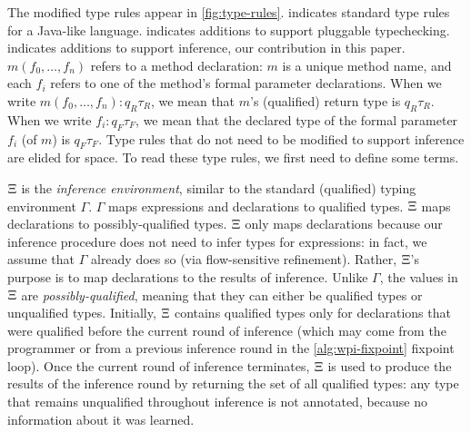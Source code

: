 \begin{figure*}
  \caption{Modified type rules used by our pluggable type framework.  indicates
    standard type rules for a Java-like language.  indicates additions to support
    pluggable typechecking.  indicates additions to support inference, \ie our
    contribution in this paper.
    Throughout, ``R'' subscripts refer to return types; ``F'' to formal parameters; ``A'' to
    actual arguments; and ``I'' to inference results.
    In an assignment \<x=y>, \<x> is the ``formal'' and \<y> is the ``actual''.
    In the \textsc{OVERRIDE} rule, the subscripts ``B'' and ``P'' are mneumonics
    for ``suBtype'' and ``suPertype'', referring the overriding method and the overidden
    method, respectively.
    Type rules that do not require modification to support inference
    are elided for space.}
  \label{fig:type-rules}
\end{figure*}

The modified type rules appear in \cref{fig:type-rules}.  indicates
standard type rules for a Java-like language.  indicates additions to support
pluggable typechecking.  indicates additions to support inference, \ie our
contribution in this paper.
%
$m(f_0,\ldots,f_n)$ refers to a method declaration: $m$ is a unique method name,
and each $f_i$ refers to one of the method's formal parameter declarations. When
we write $m(f_0,\ldots,f_n) : q_R \tau_R$, we mean that $m$'s (qualified) return
type is $q_R \tau_R$. When we write $f_i : q_F \tau_F$, we mean that the declared
type of the formal parameter $f_i$ (of $m$) is $q_F \tau_F$.
%
Type rules that do not need to be modified to support inference are elided for space.
%
To read these type rules, we first need to define some terms.

$\Xi$ is the \emph{inference environment}, similar to the standard (qualified)
typing environment $\Gamma$. $\Gamma$ maps expressions and declarations to qualified types.
$\Xi$ maps declarations to possibly-qualified types.
$\Xi$ only maps declarations because our inference procedure does not need to infer
types for expressions: in fact, we assume that $\Gamma$ already does so (via flow-sensitive
refinement). Rather, $\Xi$'s purpose is to map declarations to the results of inference.
Unlike $\Gamma$, the values in $\Xi$ are \emph{possibly-qualified}, meaning that they can either
be qualified types or unqualified types. Initially, $\Xi$ contains qualified types only
for declarations that were qualified before the current round of inference (which may come from
the programmer or from a previous inference round in the \cref{alg:wpi-fixpoint} fixpoint loop).
Once the current round of inference terminates, $\Xi$ is used to produce the results of the
inference round by returning the set of all qualified types: any type that remains unqualified
throughout inference is not annotated, because no information about it was learned.

